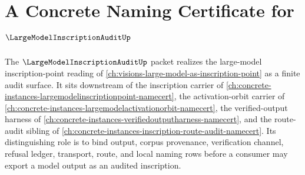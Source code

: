 \chapter{A Concrete Naming Certificate for $\LargeModelInscriptionAuditUp$}
\label{ch:concrete-instances-largemodelinscriptionaudit-namecert}

The $\LargeModelInscriptionAuditUp$ packet realizes the large-model inscription-point reading of \autoref{ch:visions-large-model-as-inscription-point} as a finite audit surface. It sits downstream of the inscription carrier of \autoref{ch:concrete-instances-largemodelinscriptionpoint-namecert}, the activation-orbit carrier of \autoref{ch:concrete-instances-largemodelactivationorbit-namecert}, the verified-output harness of \autoref{ch:concrete-instances-verifiedoutputharness-namecert}, and the route-audit sibling of \autoref{ch:concrete-instances-inscription-route-audit-namecert}. Its distinguishing role is to bind output, corpus provenance, verification channel, refusal ledger, transport, route, and local naming rows before a consumer may export a model output as an audited inscription.

